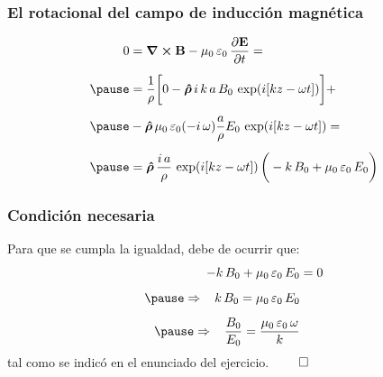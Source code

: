 \documentclass[12pt]{beamer}
\begin{document}
\begin{frame}
\frametitle{El rotacional del campo de inducción magnética}
\begin{eqnarray*}
\begin{aligned}
0 &= \curl{\vb{B}} - \mu_{0} \, \varepsilon_{0} \, \pdv{\vb{E}}{t} = \\[0.5em] \pause
&= \dfrac{1}{\rho} \bigg[ 0 - \vu{\bm{\rho}} \, i \, k \, a \, B_{0} \, \exp(i [k z - \omega t]) \bigg] + \\[0.5em] \pause
&- \vu{\bm{\rho}} \, \mu_{0} \, \varepsilon_{0} (- i \, \omega) \dfrac{a}{\rho} E_{0} \, \exp(i [k z - \omega t]) = \\[0.5em] \pause
&= \vu{\bm{\rho}} \, \dfrac{i \, a}{\rho} \, \exp(i [k z - \omega t]) \, \bigg( - k \, B_{0} + \mu_{0} \, \varepsilon_{0} \, E_{0} \bigg)
\end{aligned}
\end{eqnarray*}
\end{frame}
\begin{frame}
\frametitle{Condición necesaria}
Para que se cumpla la igualdad, debe de ocurrir que:
\pause
\begin{eqnarray*}
- k \, B_{0} + \mu_{0} \, \varepsilon_{0} \, E_{0} &= 0 \\[0.5em] \pause
\Rightarrow \hspace{0.3cm} k \, B_{0} = \mu_{0} \, \varepsilon_{0} \, E_{0} \\[0.5em] \pause
\Rightarrow \hspace{0.3cm} \dfrac{B_{0}}{E_{0}} = \dfrac{\mu_{0} \, \varepsilon_{0} \, \omega}{k}
\end{eqnarray*}
tal como se indicó en el enunciado del ejercicio. $\qed$
\end{frame}
\end{document}
